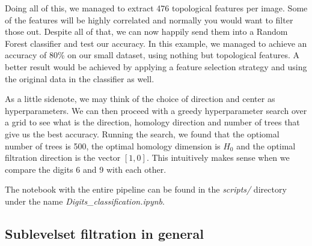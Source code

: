 Doing all of this, we managed to extract 476 topological features per image. Some of the features will be highly correlated and normally you would want to filter those out. Despite all of that, we can now happily send them into a Random Forest classifier and test our accuracy. In this example, we managed to achieve an accuracy of 80\% on our small dataset, using nothing but topological features. A better result would be achieved by applying a feature selection strategy and using the original data in the classifier as well.

As a little sidenote, we may think of the choice of direction and center as hyperparameters. We can then proceed with a greedy hyperparameter search over a grid to see what is the direction, homology direction and number of trees that give us the best accuracy. Running the search, we found that the optiomal number of trees is 500, the optimal homology dimension is $H_{0}$ and the optimal filtration direction is the vector $[1, 0]$. This intuitively makes sense when we compare the digits 6 and 9 with each other.

The notebook with the entire pipeline can be found in the \textit{scripts/} directory under the name \textit{Digits\_classification.ipynb}.

\subsection{Sublevelset filtration in general}
